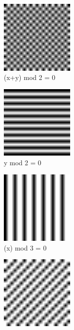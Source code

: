 \begin{figure}[H]
  \centering
  \begin{subfigure}{0.4\textwidth}
    \centering
    \includegraphics[width=0.4\textwidth]{images/qr_mask_0}
    \caption{(x+y) mod 2 = 0}
    \label{fig:qr_mask_0}
  \end{subfigure}
  \begin{subfigure}{0.4\textwidth}
    \centering
    \includegraphics[width=0.4\textwidth]{images/qr_mask_1}
    \caption{y mod 2 = 0}
    \label{fig:qr_mask_1}
  \end{subfigure}
  \begin{subfigure}{0.4\textwidth}
    \centering
    \includegraphics[width=0.4\textwidth]{images/qr_mask_2}
    \caption{(x) mod 3 = 0}
    \label{fig:qr_mask_2}
  \end{subfigure}
  \begin{subfigure}{0.4\textwidth}
    \centering
    \includegraphics[width=0.4\textwidth]{images/qr_mask_3}

\end{subfigure}
\end{figure}
